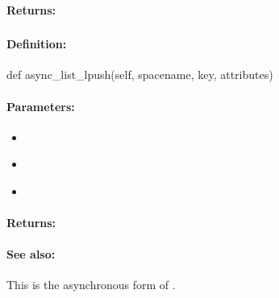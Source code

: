 \paragraph{Returns:}


\pagebreak
\subsubsection{}
\label{api:python:async_list_lpush}


\paragraph{Definition:}
\begin{pythoncode}
def async_list_lpush(self, spacename, key, attributes)
\end{pythoncode}

\paragraph{Parameters:}
\begin{itemize}[noitemsep]
\item {}\\

\item {}\\

\item {}\\

\end{itemize}

\paragraph{Returns:}


\paragraph{See also:}  This is the asynchronous form of .

\pagebreak
\subsubsection{}
\label{api:python:uxact_list_lpush}


